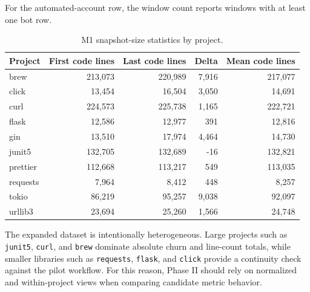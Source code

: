 For the automated-account row, the window count reports windows with at least one bot row.

\begin{table}[H]
\centering
\scriptsize
\renewcommand{\arraystretch}{1.12}
\begin{tabular}{lrrrr}
\toprule
\textbf{Project} & \textbf{First code lines} & \textbf{Last code lines} & \textbf{Delta} & \textbf{Mean code lines} \\
\midrule
brew     & 213{,}073 & 220{,}989 & 7{,}916  & 217{,}077 \\
click    & 13{,}454  & 16{,}504  & 3{,}050  & 14{,}691 \\
curl     & 224{,}573 & 225{,}738 & 1{,}165  & 222{,}721 \\
flask    & 12{,}586  & 12{,}977  & 391      & 12{,}816 \\
gin      & 13{,}510  & 17{,}974  & 4{,}464  & 14{,}730 \\
junit5   & 132{,}705 & 132{,}689 & -16      & 132{,}821 \\
prettier & 112{,}668 & 113{,}217 & 549      & 113{,}035 \\
requests & 7{,}964   & 8{,}412   & 448      & 8{,}257 \\
tokio    & 86{,}219  & 95{,}257  & 9{,}038  & 92{,}097 \\
urllib3  & 23{,}694  & 25{,}260  & 1{,}566  & 24{,}748 \\
\bottomrule
\end{tabular}
\caption{M1 snapshot-size statistics by project.}
\label{tab:round1_loc_stats}
\end{table}

The expanded dataset is intentionally heterogeneous. Large projects such as \texttt{junit5}, \texttt{curl}, and \texttt{brew}
dominate absolute churn and line-count totals, while smaller libraries such as \texttt{requests}, \texttt{flask}, and
\texttt{click} provide a continuity check against the pilot workflow. For this reason, Phase II should rely on normalized and
within-project views when comparing candidate metric behavior.
